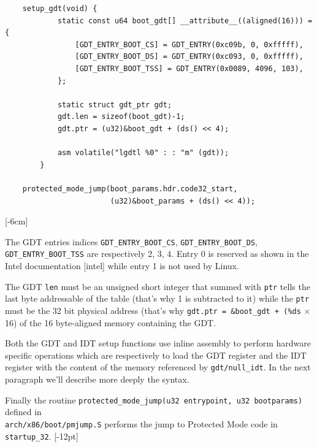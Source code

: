 \documentclass[twoside]{article}
\renewcommand{\cite}[1]{[#1]}
\begin{document}
\begin{verbatim}
    setup_gdt(void) {
            static const u64 boot_gdt[] __attribute__((aligned(16))) = {
                [GDT_ENTRY_BOOT_CS] = GDT_ENTRY(0xc09b, 0, 0xfffff),
                [GDT_ENTRY_BOOT_DS] = GDT_ENTRY(0xc093, 0, 0xfffff),
                [GDT_ENTRY_BOOT_TSS] = GDT_ENTRY(0x0089, 4096, 103),
            };

            static struct gdt_ptr gdt;
            gdt.len = sizeof(boot_gdt)-1;
            gdt.ptr = (u32)&boot_gdt + (ds() << 4);

            asm volatile("lgdtl %0" : : "m" (gdt));
        }

    protected_mode_jump(boot_params.hdr.code32_start,
                        (u32)&boot_params + (ds() << 4));
\end{verbatim}

[-6cm]

The GDT entries indices \texttt{GDT_ENTRY_BOOT_CS}, \texttt{GDT_ENTRY_BOOT_DS}, \texttt{GDT_ENTRY_BOOT_TSS} are respectively 2, 3, 4. Entry 0 is reserved as shown in the Intel documentation \cite{intel} while entry 1 is not used by Linux.



The GDT \texttt{len} must be an unsigned short integer that summed with \texttt{ptr} tells the last byte addressable of the table (that's why 1 is subtracted to it) while the \texttt{ptr} must be the 32 bit physical address (that's why \texttt{gdt.ptr = \&boot_gdt + (\%ds} $\times$ 16) of the 16 byte-aligned memory containing the GDT.


Both the GDT and IDT setup functions use inline assembly to perform hardware specific operations which are respectively to load the GDT register and the IDT register with the content of the memory referenced by \texttt{gdt/null_idt}. In the next paragraph we'll describe more deeply the syntax. 

Finally the routine \texttt{protected_mode_jump(u32 entrypoint, u32 bootparams)} defined in \\ \texttt{arch/x86/boot/pmjump.S} performs the jump to Protected Mode code in \texttt{startup_32}. [-12pt]
\end{document}
